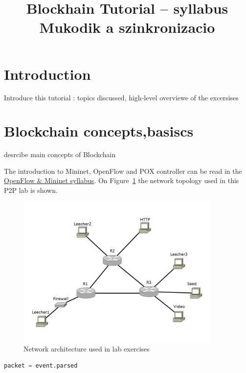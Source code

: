 \documentclass[a4paper]{article}
\title{Blockhain Tutorial – syllabus Mukodik a szinkronizacio}
\author{}
\date{}
\begin{document}
\maketitle

\tableofcontents

\section{Introduction}

Introduce this tutorial : topics discussed, high-level overviewe of the excersises

\section{Blockchain concepts,basiscs}

desrcibe main concepts of Blockchain 

The introduction to Mininet, OpenFlow and POX controller can be read in the
\href{https://qosip.tmit.bme.hu/foswiki/pub/Meres/OpenFlowMSc/OpenFlow-Mininet-syllabus-en.pdf}{OpenFlow \& Mininet
    syllabus}. On
Figure~\ref{fig:Lab-topo} the network topology used in this P2P lab is shown.

\begin{figure}[H]
    \centering
    \includegraphics[width=0.9\textwidth]{figures/halozat.png}
    \caption{Network architecture used in lab exercises}
    \label{fig:Lab-topo}
\end{figure}

\begin{lstlisting}[language=python,frame=single,breaklines]
packet = event.parsed  
\end{lstlisting}
\end{document}
